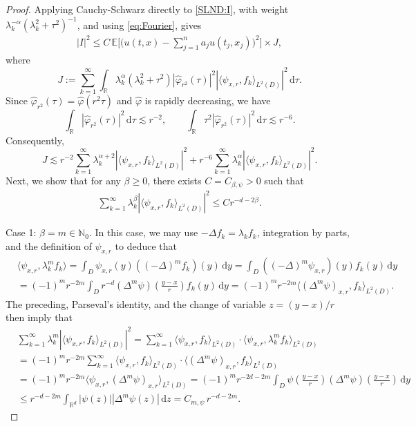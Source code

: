 \documentclass[reqno]{amsart}
\newcommand{\R}{\mathbb R}
\newcommand{\N}{\mathbb N}
\newcommand{\E}{\mathbb E}
\renewcommand{\d}{\mathrm d}
\newcommand{\1}{\mathbf 1}
\newcommand{\inner}[2]{\langle #1,#2\rangle}
\numberwithin{equation}{section}
\theoremstyle{definition}
\begin{document}
\begin{proof}
Applying Cauchy-Schwarz directly to \eqref{SLND:I}, with weight
\(\lambda_k^{-\alpha}(\lambda_k^2+\tau^2)^{-1}\), and using
\eqref{eq:Fourier}, gives
\begin{align}\label{SLND:I:CS}
    |I|^2
    \le
    C\,\E\Bigg[\bigg(u(t,x)-\sum_{j=1}^n a_j u(t_j,x_j)\bigg)^2\Bigg]\times J,
\end{align}
where
\[
    J
    :=
    \sum_{k=1}^\infty
    \int_\R
    \lambda_k^\alpha(\lambda_k^2+\tau^2)
    \left|\widehat\varphi_{r^2}(\tau)\right|^2
    \left|\inner{\psi_{x,r}}{f_k}_{L^2(D)}\right|^2\,\d\tau .
\]
Since \(\widehat\varphi_{r^2}(\tau)=\widehat\varphi(r^2\tau)\) and $\widehat{\varphi}$ is rapidly
decreasing, we have
\[
    \int_\R \left|\widehat\varphi_{r^2}(\tau)\right|^2\,\d\tau\lesssim r^{-2},
    \qquad
    \int_\R\tau^2\left|\widehat\varphi_{r^2}(\tau)\right|^2\,\d\tau\lesssim r^{-6}.
\]
Consequently,
\[
	J \lesssim r^{-2} \sum_{k=1}^\infty \lambda_k^{\alpha+2} \left| \langle \psi_{x,r}, f_k \rangle_{L^2(D)} \right|^2 + r^{-6} \sum_{k=1}^\infty \lambda_k^{\alpha} \left| \langle \psi_{x,r}, f_k \rangle_{L^2(D)} \right|^2.
\]
Next, we show that for any $\beta\ge 0$, there exists $C=C_{\beta, \psi}>0$ such that
\begin{align}\label{SLND:claim:J}
	\sum_{k=1}^\infty \lambda_k^{\beta} \left| \langle \psi_{x,r}, f_k \rangle_{L^2(D)} \right|^2 \le C r^{-d-2\beta}.
\end{align}

Case 1: $\beta = m \in \N_0$.
In this case, we may use $-\Delta f_k = \lambda_k f_k$, integration by parts, and the definition of $\psi_{x,r}$ to deduce that
\begin{align*}
	&\langle \psi_{x,r} , \lambda_k^m f_k\rangle
	= \int_D \psi_{x,r}(y) ((-\Delta)^m f_k) (y) \, \d y
	=\int_D ((-\Delta)^m \psi_{x,r}) (y) f_k(y)  \, \d y\\
	& = (-1)^m r^{-2m} \int_D r^{-d}(\Delta^m\psi)(\tfrac{y-x}{r}) f_k(y) \, \d y = (-1)^m r^{-2m} \langle (\Delta^m\psi)_{x,r} , f_k\rangle_{L^2(D)}.
\end{align*}
The preceding, Parseval's identity, and the change of variable $z=(y-x)/r$ then imply that
\begin{align*}
	&\sum_{k=1}^\infty \lambda_k^{m} \left| \langle \psi_{x,r}, f_k \rangle_{L^2(D)} \right|^2
	= \sum_{k=1}^\infty \langle \psi_{x,r}, f_k \rangle_{L^2(D)} \cdot \langle \psi_{x,r}, \lambda_k^m f_k \rangle_{L^2(D)}\\
	&= (-1)^m r^{-2m} \sum_{k=1}^\infty \langle \psi_{x,r}, f_k \rangle_{L^2(D)} \cdot \langle (\Delta^m\psi)_{x,r}, f_k \rangle_{L^2(D)}\\
	&= (-1)^m r^{-2m} \langle \psi_{x,r} , (\Delta^m \psi)_{x,r} \rangle_{L^2(D)}
	=(-1)^m r^{-2d-2m} \int_D \psi(\tfrac{y-x}{r}) (\Delta^m \psi)(\tfrac{y-x}{r}) \, \d y\\
	& \le r^{-d-2m} \int_{\R^d} |\psi(z)| |\Delta^m \psi (z)| \, \d z = C_{m,\psi}\, r^{-d-2m}.
\end{align*}


\end{proof}
\end{document}
